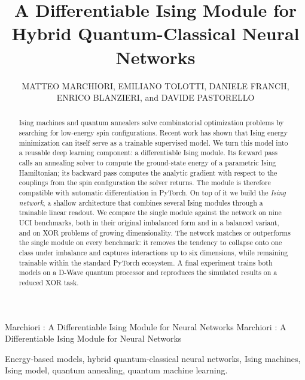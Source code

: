 \documentclass{ieeeaccess}
\begin{document}

\title{A Differentiable Ising Module for Hybrid Quantum-Classical Neural Networks}
\author{\uppercase{Matteo Marchiori},
\uppercase{Emiliano Tolotti},
\uppercase{Daniele Franch},
\uppercase{Enrico Blanzieri},
and \uppercase{Davide Pastorello}}
\address[1]{Department of Information Engineering and Computer Science - University of Trento, Trento, Italy}
\address[2]{Department of Mathematics -- University of Bologna, 40126 Bologna, Italy;
TIFPA-INFN, 38123 Povo-Trento, Italy}

\markboth
{Marchiori \headeretal: A Differentiable Ising Module for Neural Networks}
{Marchiori \headeretal: A Differentiable Ising Module for Neural Networks}


\begin{abstract}
Ising machines and quantum annealers solve combinatorial optimization problems by searching for low-energy spin configurations. Recent work has shown that Ising energy minimization can itself serve as a trainable supervised model. We turn this model into a reusable deep learning component: a differentiable Ising module. Its forward pass calls an annealing solver to compute the ground-state energy of a parametric Ising Hamiltonian; its backward pass computes the analytic gradient with respect to the couplings from the spin configuration the solver returns. The module is therefore compatible with automatic differentiation in PyTorch. On top of it we build the \textit{Ising network}, a shallow architecture that combines several Ising modules through a trainable linear readout. We compare the single module against the network on nine UCI benchmarks, both in their original imbalanced form and in a balanced variant, and on XOR problems of growing dimensionality. The network matches or outperforms the single module on every benchmark: it removes the tendency to collapse onto one class under imbalance and captures interactions up to six dimensions, while remaining trainable within the standard PyTorch ecosystem. A final experiment trains both models on a D-Wave quantum processor and reproduces the simulated results on a reduced XOR task.
\end{abstract}

\begin{keywords}
Energy-based models, hybrid quantum-classical neural networks, Ising machines, Ising model, quantum annealing, quantum machine learning.
\end{keywords}
\end{document}
